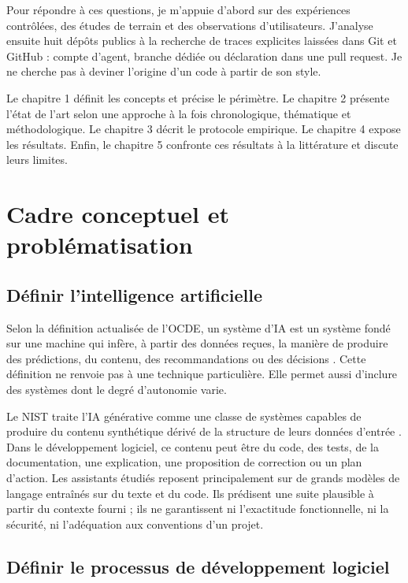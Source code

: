 \documentclass[12pt,a4paper,oneside]{report}
\begin{document}
Pour répondre à ces questions, je m'appuie d'abord sur des expériences contrôlées, des études de terrain et des observations d'utilisateurs. J'analyse ensuite huit dépôts publics à la recherche de traces explicites laissées dans Git et GitHub : compte d'agent, branche dédiée ou déclaration dans une pull request. Je ne cherche pas à deviner l'origine d'un code à partir de son style.

Le chapitre 1 définit les concepts et précise le périmètre. Le chapitre 2 présente l'état de l'art selon une approche à la fois chronologique, thématique et méthodologique. Le chapitre 3 décrit le protocole empirique. Le chapitre 4 expose les résultats. Enfin, le chapitre 5 confronte ces résultats à la littérature et discute leurs limites.

\chapter{Cadre conceptuel et problématisation}

\section{Définir l'intelligence artificielle}

Selon la définition actualisée de l'OCDE, un système d'IA est un système fondé sur une machine qui infère, à partir des données reçues, la manière de produire des prédictions, du contenu, des recommandations ou des décisions \parencite{oecd2024definition}. Cette définition ne renvoie pas à une technique particulière. Elle permet aussi d'inclure des systèmes dont le degré d'autonomie varie.

Le NIST traite l'IA générative comme une classe de systèmes capables de produire du contenu synthétique dérivé de la structure de leurs données d'entrée \parencite{nist2024genai}. Dans le développement logiciel, ce contenu peut être du code, des tests, de la documentation, une explication, une proposition de correction ou un plan d'action. Les assistants étudiés reposent principalement sur de grands modèles de langage entraînés sur du texte et du code. Ils prédisent une suite plausible à partir du contexte fourni ; ils ne garantissent ni l'exactitude fonctionnelle, ni la sécurité, ni l'adéquation aux conventions d'un projet.

\section{Définir le processus de développement logiciel}
\end{document}
